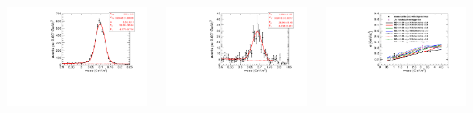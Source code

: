 \documentclass[compress]{beamer}
\begin{document}
\begin{frame}
\begin{columns}
\includegraphics[width=\linewidth]{respeak_jpsi.pdf}

\includegraphics[width=\linewidth]{respeak_psiprime.pdf}


\includegraphics[width=\linewidth]{resolution.pdf}
\end{columns}


\end{frame}
\end{document}
